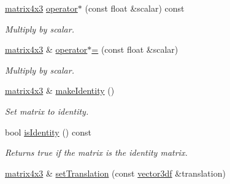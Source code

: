 \begin{DoxyCompactItemize}
\item 
\hyperlink{classirr_1_1core_1_1matrix4x3}{matrix4x3} \hyperlink{classirr_1_1core_1_1matrix4x3_ad44108f3d062004b4b5066f425594135}{operator$\ast$} (const float \&scalar) const \hypertarget{classirr_1_1core_1_1matrix4x3_ad44108f3d062004b4b5066f425594135}{}\label{classirr_1_1core_1_1matrix4x3_ad44108f3d062004b4b5066f425594135}

\begin{DoxyCompactList}\small\item\em Multiply by scalar. \end{DoxyCompactList}\item 
\hyperlink{classirr_1_1core_1_1matrix4x3}{matrix4x3} \& \hyperlink{classirr_1_1core_1_1matrix4x3_adecf33df3d6e8f5a5c95281560154ec1}{operator$\ast$=} (const float \&scalar)\hypertarget{classirr_1_1core_1_1matrix4x3_adecf33df3d6e8f5a5c95281560154ec1}{}\label{classirr_1_1core_1_1matrix4x3_adecf33df3d6e8f5a5c95281560154ec1}

\begin{DoxyCompactList}\small\item\em Multiply by scalar. \end{DoxyCompactList}\item 
\hyperlink{classirr_1_1core_1_1matrix4x3}{matrix4x3} \& \hyperlink{classirr_1_1core_1_1matrix4x3_a46f40cd1931c6ea3d864e555f49f2170}{make\+Identity} ()\hypertarget{classirr_1_1core_1_1matrix4x3_a46f40cd1931c6ea3d864e555f49f2170}{}\label{classirr_1_1core_1_1matrix4x3_a46f40cd1931c6ea3d864e555f49f2170}

\begin{DoxyCompactList}\small\item\em Set matrix to identity. \end{DoxyCompactList}\item 
bool \hyperlink{classirr_1_1core_1_1matrix4x3_ae7f9f79c1544452196efbc1cefe5d7cf}{is\+Identity} () const \hypertarget{classirr_1_1core_1_1matrix4x3_ae7f9f79c1544452196efbc1cefe5d7cf}{}\label{classirr_1_1core_1_1matrix4x3_ae7f9f79c1544452196efbc1cefe5d7cf}

\begin{DoxyCompactList}\small\item\em Returns true if the matrix is the identity matrix. \end{DoxyCompactList}\item 
\hyperlink{classirr_1_1core_1_1matrix4x3}{matrix4x3} \& \hyperlink{classirr_1_1core_1_1matrix4x3_acc396dd2457de0053161298b719041c3}{set\+Translation} (const \hyperlink{namespaceirr_1_1core_a06f169d08b5c429f5575acb7edbad811}{vector3df} \&translation)\hypertarget{classirr_1_1core_1_1matrix4x3_acc396dd2457de0053161298b719041c3}{}\label{classirr_1_1core_1_1matrix4x3_acc396dd2457de0053161298b719041c3}


\end{DoxyCompactItemize}
